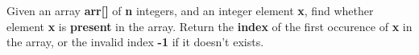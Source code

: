 Given an array \textbf{arr[]} of \textbf{n} integers, and an integer element \textbf{x}, find whether element \textbf{x} is \textbf{present} in the array. Return the \textbf{index} of the first occurence of \textbf{x} in the array, or the invalid index \textbf{-1} if it doesn't exists.
